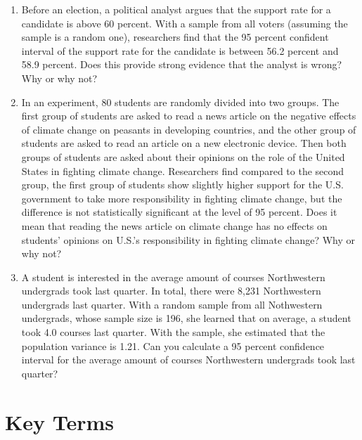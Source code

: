\documentclass{book}
\begin{document}
\begin{enumerate}
\def\labelenumi{\arabic{enumi}.}
\item
  Before an election, a political analyst argues that the support rate for a
  candidate is above 60 percent. With a sample from all voters (assuming the
  sample is a random one), researchers find that the 95 percent confident
  interval of the support rate for the candidate is between 56.2 percent and
  58.9 percent. Does this provide strong evidence that the analyst is wrong?
  Why or why not?
\item
  In an experiment, 80 students are randomly divided into two groups. The
  first group of students are asked to read a news article on the negative
  effects of climate change on peasants in developing countries, and the other
  group of students are asked to read an article on a new electronic device.
  Then both groups of students are asked about their opinions on the role of
  the United States in fighting climate change. Researchers find compared to
  the second group, the first group of students show slightly higher support
  for the U.S. government to take more responsibility in fighting climate
  change, but the difference is not statistically significant at the level of
  95 percent. Does it mean that reading the news article on climate change has
  no effects on students' opinions on U.S.'s responsibility in fighting
  climate change? Why or why not?
\item
  A student is interested in the average amount of courses Northwestern
  undergrads took last quarter. In total, there were 8,231 Northwestern
  undergrads last quarter. With a random sample from all Nothwestern
  undergrads, whose sample size is 196, she learned that on average, a student
  took 4.0 courses last quarter. With the sample, she estimated that the
  population variance is 1.21. Can you calculate a 95 percent confidence
  interval for the average amount of courses Northwestern undergrads took last
  quarter?
\end{enumerate}

\hypertarget{key-terms-2}{%
\section{Key Terms}\label{key-terms-2}}
\end{document}
